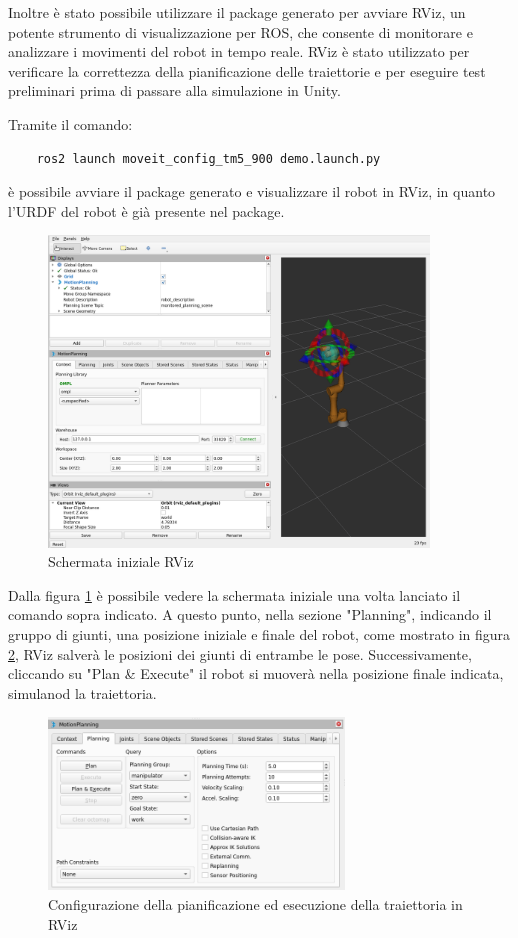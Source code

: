 \documentclass[11pt]{report}
\begin{document}
Inoltre è stato possibile utilizzare il package generato per avviare RViz, un potente strumento di visualizzazione per ROS, che consente di monitorare e analizzare i movimenti del robot in tempo reale. RViz è stato utilizzato per verificare la correttezza della pianificazione delle traiettorie e per eseguire test preliminari prima di passare alla simulazione in Unity.

Tramite il comando:
\begin{verbatim}
    ros2 launch moveit_config_tm5_900 demo.launch.py
\end{verbatim}

è possibile avviare il package generato e visualizzare il robot in RViz, in quanto l'URDF del robot è già presente nel package.

\begin{figure}[H]
    \centering
    \includegraphics[width=0.9\textwidth]{images/rviz_1.PNG}
    \caption{Schermata iniziale RViz}
    \label{fig:rviz_1}
\end{figure}

Dalla figura \ref{fig:rviz_1} è possibile vedere la schermata iniziale una volta lanciato il comando sopra indicato.
A questo punto, nella sezione "Planning", indicando il gruppo di giunti, una posizione iniziale e finale del robot, come mostrato in figura \ref{fig:rviz_2}, RViz salverà le posizioni dei giunti di entrambe le pose. Successivamente, cliccando su "Plan \& Execute" il robot si muoverà nella posizione finale indicata, simulanod la traiettoria.

\begin{figure}[H]
    \centering
    \includegraphics[width=0.7\textwidth]{images/rviz_2.PNG}
    \caption{Configurazione della pianificazione ed esecuzione della traiettoria in RViz}
    \label{fig:rviz_2}
\end{figure}
\end{document}
